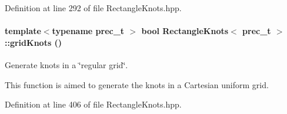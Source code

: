 Definition at line 292 of file RectangleKnots.hpp.\hypertarget{classRectangleKnots_ec4183669ad966749af37ef39ea5aaed}{
\paragraph[{gridKnots}]{\setlength{\rightskip}{0pt plus 5cm}template$<$typename prec\_\-t $>$ bool {\bf RectangleKnots}$<$ prec\_\-t $>$::gridKnots ()}\hfill}
\label{classRectangleKnots_ec4183669ad966749af37ef39ea5aaed}


Generate knots in a \char`\"{}regular grid\char`\"{}. 

This function is aimed to generate the knots in a Cartesian uniform grid. 

Definition at line 406 of file RectangleKnots.hpp.